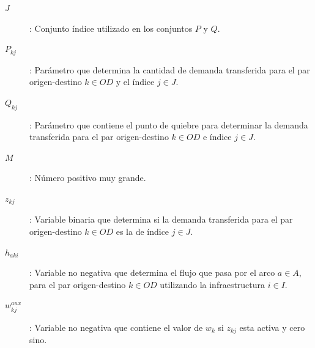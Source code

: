 \documentclass{article}
\begin{document}
  \begin{description}
    \item[$J$]: Conjunto índice utilizado en los conjuntos $P$ y $Q$.
    \item[$P_{kj}$]: Parámetro que determina la cantidad de demanda transferida para el par origen-destino $k \in OD$ y el índice $j \in J$.
    \item[$Q_{kj}$]: Parámetro que contiene el punto de quiebre para determinar la demanda transferida para el par origen-destino $k \in OD$ e índice $j \in J$.
    \item[$M$]: Número positivo muy grande.
    \item[$z_{kj}$]: Variable binaria que determina si la demanda transferida para el par origen-destino $k \in OD$ es la de índice $j \in J$.
    \item[$h_{aki}$]: Variable no negativa que determina el flujo que pasa por el arco $a \in A$, para el par origen-destino $k \in OD$ utilizando la infraestructura $i \in I$.
    \item[$w^{aux}_{kj}$]: Variable no negativa que contiene el valor de $w_{k}$ si $z_{kj}$ esta activa y cero sino.
  \end{description}
\end{document}
